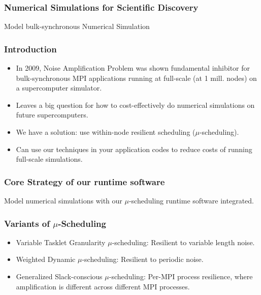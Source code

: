 \begin{frame}
\frametitle{Numerical Simulations for Scientific Discovery}
\begin{center}
Model bulk-synchronous Numerical Simulation
\end{center}
\end{frame}

\begin{frame}
\frametitle{Introduction}
\begin{itemize}
\item \small In 2009, Noise Amplification Problem was shown
  fundamental inhibitor for bulk-synchronous MPI applications running
  at full-scale (at 1 mill. nodes) on a supercomputer simulator.
\item \small Leaves a big question for how to cost-effectively do
  numerical simulations on future supercomputers.
\item \small We have a solution: use within-node resilient scheduling
  ($\mu$-scheduling).
\item \small Can use our techniques in your application codes to
  reduce costs of running full-scale simulations.
\end{itemize}
\end{frame}

\begin{frame}
\frametitle{Core Strategy of our runtime software}
\begin{center}
Model numerical simulations with our $\mu$-scheduling runtime software integrated.
\end{center}
\end{frame}


\begin{frame}
\frametitle{Variants of  $\mu$-Scheduling}
\begin{itemize}
\item Variable Tasklet Granularity $\mu$-scheduling: Resilient to variable length noise.
\item Weighted Dynamic $\mu$-scheduling: Resilient to periodic noise.
\item Generalized Slack-conscious $\mu$-scheduling: Per-MPI process resilience, where amplification is different across different MPI processes.
\end{itemize}
\end{frame}

